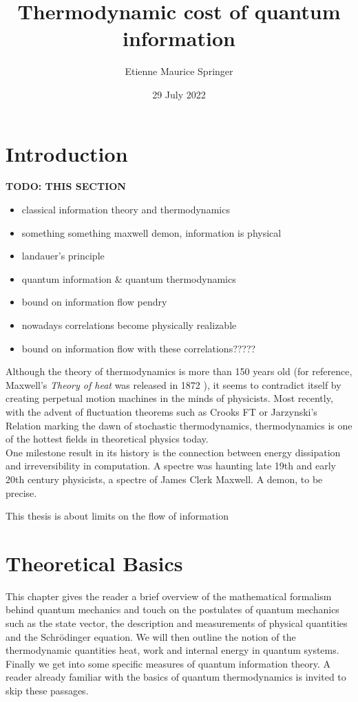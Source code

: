 \documentclass{book}
\title{Thermodynamic cost of quantum information} %
\author{Etienne Maurice Springer}%
\date{29 July 2022}
\institute{Institute for Theoretical Physics I}
\numberwithin{equation}{section} %
\begin{document}
\makethesistitle

\tableofcontents
\chapter{Introduction}
\textbf{TODO: THIS SECTION}
\begin{itemize}
    \item classical information theory and thermodynamics 
    \item something something maxwell demon, information is physical \cite{BA_maxwelldemon}
    \item landauer's principle \cite{HS_BA_landauer1961irreversibility}
    \item quantum information \& quantum thermodynamics
    \item bound on information flow pendry \cite{BA_Pendry_1983}
    \item nowadays correlations become physically realizable \cite{BA_kaonan_correlations}
    \item bound on information flow with these correlations?????
\end{itemize}
Although the theory of thermodynamics is more than 150 years old 
(for reference, Maxwell's \emph{Theory of heat} was released in 1872 \cite{BA_maxwelldemon}),
it seems to contradict itself by creating perpetual motion machines in the minds of physicists.
Most recently, with the advent of fluctuation theorems such as Crooks FT \cite{BA_CROOKS-fluctuation}
or Jarzynski's Relation \cite{HS_Jarzynski_1997} marking the dawn of stochastic thermodynamics, \cite{HS_BA_Seifert_2012}
thermodynamics is one of the hottest fields in theoretical physics today.\\

One milestone result in its history is the connection between energy dissipation and irreversibility in
computation. A spectre was haunting late 19th and early 20th century physicists, a spectre of James Clerk Maxwell.
A demon, to be precise.

This thesis is about limits on the flow of information

\chapter{Theoretical Basics}
This chapter gives the reader a brief overview of 
the mathematical formalism behind quantum mechanics and touch on the postulates
of quantum mechanics such as the state vector, the description and measurements of physical quantities 
and the Schrödinger equation.
We will then outline the notion of the thermodynamic quantities heat, work and internal energy
in quantum systems.
Finally we get into some specific measures of quantum information theory.
A reader already familiar with the basics of quantum thermodynamics is invited to skip these passages.
\end{document}

